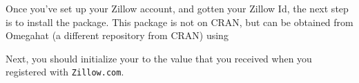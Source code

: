 Once you've set up your Zillow account, and gotten your Zillow Id,
the next step is to install the  package. This package is
not on CRAN, but can be obtained from Omegahat (a different repository from CRAN) using
\begin{knitrout}
\end{knitrout}


Next, you should initialize your  to the value that you 
received when you registered with {\tt Zillow.com}.
\begin{knitrout}
\end{knitrout}




